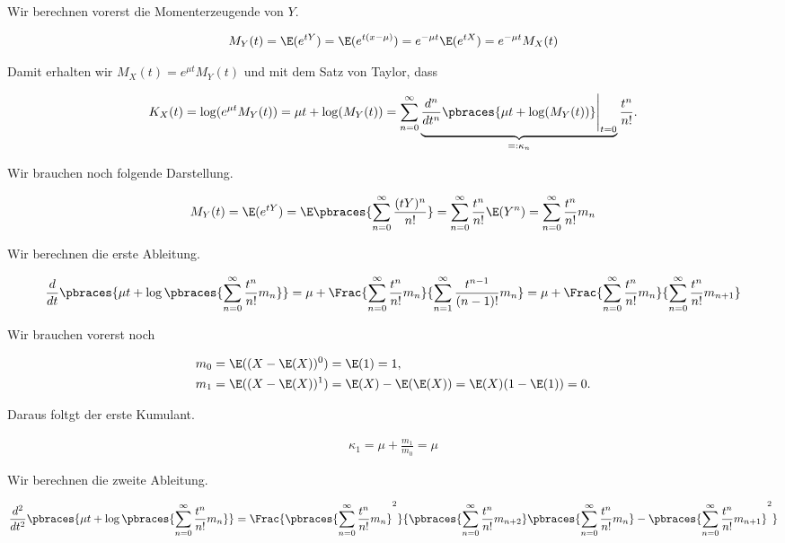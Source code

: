 \begin{solution}

Wir berechnen vorerst die Momenterzeugende von $Y$.

\begin{align*}
  M_Y(t)
  = \E(e^{tY})
  = \E(e^{t (x - \mu)})
  = e^{-\mu t} \E(e^{tX})
  = e^{-\mu t} M_X(t)
\end{align*}

Damit erhalten wir $M_X(t) = e^{\mu t} M_Y(t)$ und mit dem Satz von Taylor, dass

\begin{align*}
  K_X(t)
  = \log(e^{\mu t} M_Y(t))
  = \mu t + \log(M_Y(t))
  = \sum_{n=0}^\infty
    \underbrace
    {
      \frac{d^n}{dt^n}
      \pbraces{\mu t + \log(M_Y(t))} \Bigg|_{t=0}
    }_{=: \kappa_n}
    \frac{t^n}{n!}.
\end{align*}

Wir brauchen noch folgende Darstellung.

\begin{align*}
  M_Y(t)
  = \E(e^{tY})
  = \E
    \pbraces
    {
      \sum_{n=0}^\infty
      \frac{(tY)^n}{n!}
    }
  = \sum_{n=0}^\infty \frac{t^n}{n!} \E(Y^n)
  = \sum_{n=0}^\infty \frac{t^n}{n!} m_n
\end{align*}

Wir berechnen die erste Ableitung.

\begin{align*}
  \frac{d}{dt}
  \pbraces{\mu t + \log \pbraces{\sum_{n=0}^\infty \frac{t^n}{n!} m_n}}
  = \mu + \Frac
    {\sum_{n=0}^\infty \frac{t^n}{n!} m_n}
    {\sum_{n=1}^\infty \frac{t^{n-1}}{(n-1)!} m_n}
  = \mu + \Frac
    {\sum_{n=0}^\infty \frac{t^n}{n!} m_n}
    {\sum_{n=0}^\infty \frac{t^n}{n!} m_{n+1}}
\end{align*}

Wir brauchen vorerst noch

\begin{align*}
  m_0 & = \E((X - \E(X))^0) = \E(1) = 1, \\
  m_1 & = \E((X - \E(X))^1) = \E(X) - \E(\E(X)) = \E(X) (1 - \E(1)) = 0.
\end{align*}

Daraus foltgt der erste Kumulant.

\begin{align*}
  \kappa_1 = \mu + \frac{m_1}{m_0} = \mu
\end{align*}

Wir berechnen die zweite Ableitung.

\begin{align*}
  \frac{d^2}{dt^2}
  \pbraces{\mu t + \log \pbraces{\sum_{n=0}^\infty \frac{t^n}{n!} m_n}}
  = \Frac
    {\pbraces{\sum_{n=0}^\infty \frac{t^n}{n!} m_n}^2}
    {
      \pbraces{\sum_{n=0}^\infty \frac{t^n}{n!} m_{n+2}}
      \pbraces{\sum_{n=0}^\infty \frac{t^n}{n!} m_n} -
      \pbraces{\sum_{n=0}^\infty \frac{t^n}{n!} m_{n+1}}^2
    }
\end{align*}


\end{solution}
